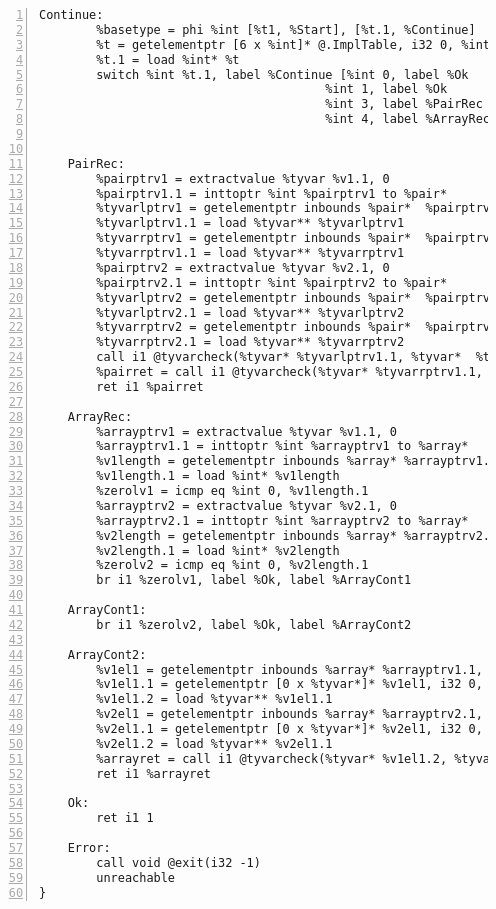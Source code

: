 \begin{lstlisting}[frame=single,numbers=left, language={[x86masm]Assembler}, caption={[Pair Structure: LLVM]Translation of the Pair structure.},
label=llvm:polymorphic]
	Continue:
		%basetype = phi %int [%t1, %Start], [%t.1, %Continue]
		%t = getelementptr [6 x %int]* @.ImplTable, i32 0, %int %basetype
		%t.1 = load %int* %t
		switch %int %t.1, label %Continue [%int 0, label %Ok
										%int 1, label %Ok
									 	%int 3, label %PairRec
									 	%int 4, label %ArrayRec]


	PairRec:
		%pairptrv1 = extractvalue %tyvar %v1.1, 0
		%pairptrv1.1 = inttoptr %int %pairptrv1 to %pair*
		%tyvarlptrv1 = getelementptr inbounds %pair*  %pairptrv1.1, i32 0, i32 0
		%tyvarlptrv1.1 = load %tyvar** %tyvarlptrv1
		%tyvarrptrv1 = getelementptr inbounds %pair*  %pairptrv1.1, i32 0, i32 0
		%tyvarrptrv1.1 = load %tyvar** %tyvarrptrv1
		%pairptrv2 = extractvalue %tyvar %v2.1, 0
		%pairptrv2.1 = inttoptr %int %pairptrv2 to %pair*
		%tyvarlptrv2 = getelementptr inbounds %pair*  %pairptrv2.1, i32 0, i32 0
		%tyvarlptrv2.1 = load %tyvar** %tyvarlptrv2
		%tyvarrptrv2 = getelementptr inbounds %pair*  %pairptrv2.1, i32 0, i32 0
		%tyvarrptrv2.1 = load %tyvar** %tyvarrptrv2
		call i1 @tyvarcheck(%tyvar* %tyvarlptrv1.1, %tyvar*  %tyvarlptrv2.1)
		%pairret = call i1 @tyvarcheck(%tyvar* %tyvarrptrv1.1, %tyvar*  %tyvarrptrv2.1)
		ret i1 %pairret

	ArrayRec:
		%arrayptrv1 = extractvalue %tyvar %v1.1, 0
		%arrayptrv1.1 = inttoptr %int %arrayptrv1 to %array*
		%v1length = getelementptr inbounds %array* %arrayptrv1.1, i32 0, i32 0
		%v1length.1 = load %int* %v1length
		%zerolv1 = icmp eq %int 0, %v1length.1
		%arrayptrv2 = extractvalue %tyvar %v2.1, 0
		%arrayptrv2.1 = inttoptr %int %arrayptrv2 to %array*
		%v2length = getelementptr inbounds %array* %arrayptrv2.1, i32 0, i32 0
		%v2length.1 = load %int* %v2length
		%zerolv2 = icmp eq %int 0, %v2length.1
		br i1 %zerolv1, label %Ok, label %ArrayCont1

	ArrayCont1:
		br i1 %zerolv2, label %Ok, label %ArrayCont2

	ArrayCont2:
		%v1el1 = getelementptr inbounds %array* %arrayptrv1.1, i32 0, i32 1
		%v1el1.1 = getelementptr [0 x %tyvar*]* %v1el1, i32 0, i32 0
		%v1el1.2 = load %tyvar** %v1el1.1
		%v2el1 = getelementptr inbounds %array* %arrayptrv2.1, i32 0, i32 1
		%v2el1.1 = getelementptr [0 x %tyvar*]* %v2el1, i32 0, i32 0
		%v2el1.2 = load %tyvar** %v2el1.1
		%arrayret = call i1 @tyvarcheck(%tyvar* %v1el1.2, %tyvar* %v2el1.2)
		ret i1 %arrayret

	Ok:
		ret i1 1

	Error:
		call void @exit(i32 -1)
  		unreachable
}
\end{lstlisting}
%	
%
